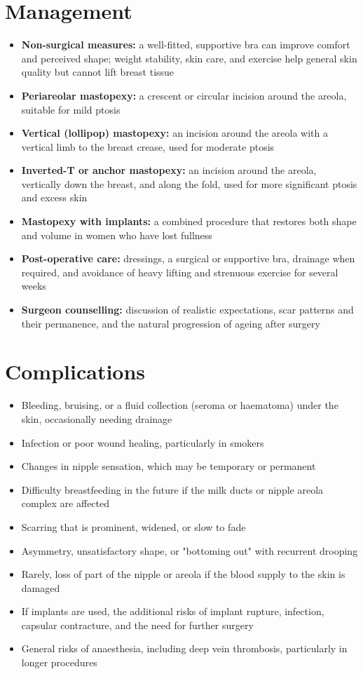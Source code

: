 \section*{Management}
\begin{itemize}
    \item \textbf{Non-surgical measures:} a well-fitted, supportive bra can improve comfort and perceived shape; weight stability, skin care, and exercise help general skin quality but cannot lift breast tissue
    \item \textbf{Periareolar mastopexy:} a crescent or circular incision around the areola, suitable for mild ptosis
    \item \textbf{Vertical (lollipop) mastopexy:} an incision around the areola with a vertical limb to the breast crease, used for moderate ptosis
    \item \textbf{Inverted-T or anchor mastopexy:} an incision around the areola, vertically down the breast, and along the fold, used for more significant ptosis and excess skin
    \item \textbf{Mastopexy with implants:} a combined procedure that restores both shape and volume in women who have lost fullness
    \item \textbf{Post-operative care:} dressings, a surgical or supportive bra, drainage when required, and avoidance of heavy lifting and strenuous exercise for several weeks
    \item \textbf{Surgeon counselling:} discussion of realistic expectations, scar patterns and their permanence, and the natural progression of ageing after surgery
\end{itemize}

\section*{Complications}
\begin{itemize}
    \item Bleeding, bruising, or a fluid collection (seroma or haematoma) under the skin, occasionally needing drainage
    \item Infection or poor wound healing, particularly in smokers
    \item Changes in nipple sensation, which may be temporary or permanent
    \item Difficulty breastfeeding in the future if the milk ducts or nipple areola complex are affected
    \item Scarring that is prominent, widened, or slow to fade
    \item Asymmetry, unsatisfactory shape, or "bottoming out" with recurrent drooping
    \item Rarely, loss of part of the nipple or areola if the blood supply to the skin is damaged
    \item If implants are used, the additional risks of implant rupture, infection, capsular contracture, and the need for further surgery
    \item General risks of anaesthesia, including deep vein thrombosis, particularly in longer procedures
\end{itemize}

